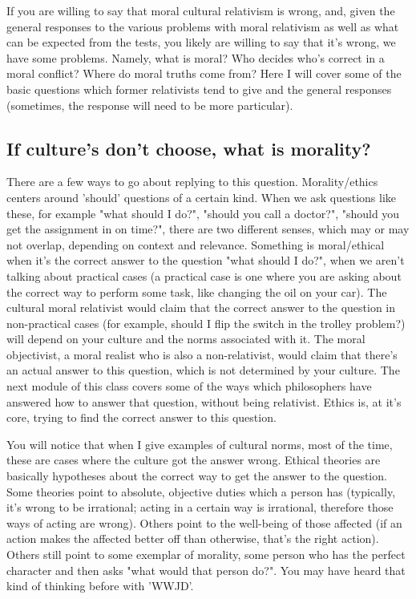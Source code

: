 If you are willing to say that moral cultural relativism is wrong, and, given the general responses to the various problems with moral relativism as well as what can be expected from the tests, you likely are willing to say that it's wrong, we have some problems. Namely, what is moral? Who decides who's correct in a moral conflict? Where do moral truths come from? Here I will cover some of the basic questions which former relativists tend to give and the general responses (sometimes, the response will need to be more particular).
\subsection{If culture's don't choose, what is morality?}

There are a few ways to go about replying to this question. Morality/ethics centers around 'should' questions of a certain kind. When we ask questions like these, for example "what should I do?", "should you call a doctor?", "should you get the assignment in on time?",  there are two different senses, which may or may not overlap, depending on context and relevance. Something is moral/ethical when it's the correct answer to the question "what should I do?", when we aren't talking about practical cases (a practical case is one where you are asking about the correct way to perform some task, like changing the oil on your car). The cultural moral relativist would claim that the correct answer to the question in non-practical cases (for example, should I flip the switch in the trolley problem?) will depend on your culture and the norms associated with it. The moral objectivist, a moral realist who is also a non-relativist, would claim that there's an actual answer to this question, which is not determined by your culture. The next module of this class covers some of the ways which philosophers have answered how to answer that question, without being relativist. Ethics is, at it's core, trying to find the correct answer to this question.

You will notice that when I give examples of cultural norms, most of the time, these are cases where the culture got the answer wrong. Ethical theories are basically hypotheses about the correct way to get the answer to the question. Some theories point to absolute, objective duties which a person has (typically, it's wrong to be irrational; acting in a certain way is irrational, therefore those ways of acting are wrong). Others point to the well-being of those affected (if an action makes the affected better off than otherwise, that's the right action). Others still point to some exemplar of morality, some person who has the perfect character and then asks "what would that person do?". You may have heard that kind of thinking before with 'WWJD'.  
